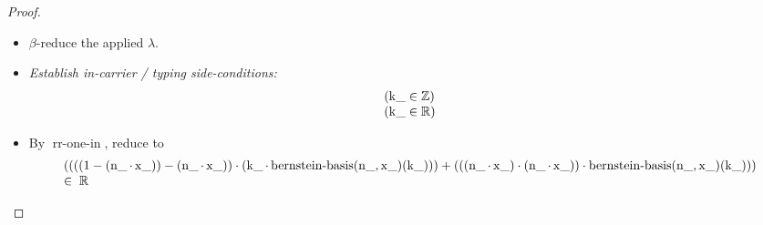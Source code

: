 \documentclass[11pt]{article}
\theoremstyle{plain}
\begin{document}
\begin{proof}
\begin{itemize}[leftmargin=2.8em, itemsep=4pt, parsep=1pt]
  \item[\textbf{65--66}] $\beta$-reduce the applied $\lambda$.
  \item[\textbf{67--68}] \emph{Establish in-carrier / typing side-conditions:}
\begin{equation*}
\begin{array}{@{}l@{}}
(\operatorname{k\_} \in \mathbb{Z}) \\
(\operatorname{k\_} \in \mathbb{R})
\end{array}
\end{equation*}

  \item[\textbf{69}] By $\operatorname{rr\text{-}one\text{-}in}$, reduce to
\begin{equation*}
\begin{array}{@{}l@{}} ((((1 - (\operatorname{n\_} \cdot \operatorname{x\_})) - (\operatorname{n\_} \cdot \operatorname{x\_})) \cdot (\operatorname{k\_} \cdot \operatorname{bernstein\text{-}basis}(\operatorname{n\_}, \operatorname{x\_})(\operatorname{k\_}))) + (((\operatorname{n\_} \cdot \operatorname{x\_}) \cdot (\operatorname{n\_} \cdot \operatorname{x\_})) \cdot \operatorname{bernstein\text{-}basis}(\operatorname{n\_}, \operatorname{x\_})(\operatorname{k\_}))) \\ \in\; \mathbb{R} \end{array}
\end{equation*}


\end{itemize}
\end{proof}
\end{document}
